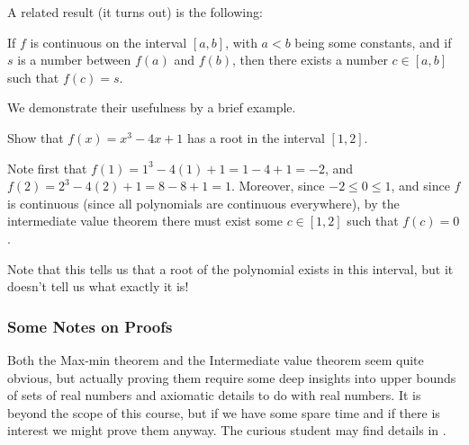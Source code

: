 \noindent
A related result (it turns out) is the following:

\begin{theorem}
	If $f$ is continuous on the interval $[a, b]$, with $a < b$ being some constants, and if $s$ is a number between $f(a)$ and $f(b)$, then there exists a number $c \in [a, b]$ such that $f(c) = s$.
\end{theorem}

\noindent
We demonstrate their usefulness by a brief example.

\begin{example}
	Show that $f(x) = x^3 - 4x + 1$ has a root in the interval $[1, 2]$.

	Note first that $f(1) = 1^3 - 4 (1) + 1 = 1 - 4 + 1 = -2$, and $f(2) = 2^3 - 4(2) + 1 = 8 - 8 + 1 = 1$.
	Moreover, since $-2 \leq 0 \leq 1$, and since $f$ is continuous (since all polynomials are continuous everywhere), by the intermediate value theorem there must exist some $c \in [1, 2]$ such that $f(c) = 0$.

	Note that this tells us that a root of the polynomial exists in this interval, but it doesn't tell us what exactly it is!
\end{example}

\subsubsection*{Some Notes on Proofs}

Both the Max-min theorem and the Intermediate value theorem seem quite obvious, but actually proving them require some deep insights into upper bounds of sets of real numbers and axiomatic details to do with real numbers. It is beyond the scope of this course, but if we have some spare time and if there is interest we might prove them anyway.
The curious student may find details in \cite[Appendix~]{Adams2013}.
